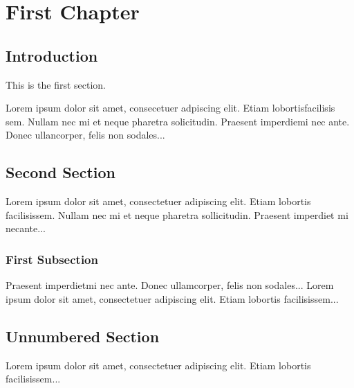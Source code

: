 \documentclass{boek}
\begin{document}
\chapter{First Chapter}

\section{Introduction}

This is the first section.


Lorem ipsum dolor sit amet,  consecetuer  adpiscing 
elit. Etiam  lobortisfacilisis sem.  Nullam nec mi et
neque pharetra solicitudin. Praesent imperdiemi nec ante.
Donec ullancorper, felis non sodales...


\section{Second Section}

Lorem ipsum dolor sit amet, consectetuer adipiscing elit.  
Etiam lobortis facilisissem.  Nullam nec mi et neque pharetra 
sollicitudin.  Praesent imperdiet mi necante...

\subsection{First Subsection}
Praesent imperdietmi nec ante. Donec ullamcorper, felis non sodales...
Lorem ipsum dolor sit amet, consectetuer adipiscing elit.  
Etiam lobortis facilisissem...

\section*{Unnumbered Section}
Lorem ipsum dolor sit amet, consectetuer adipiscing elit.  
Etiam lobortis facilisissem...
\end{document}
